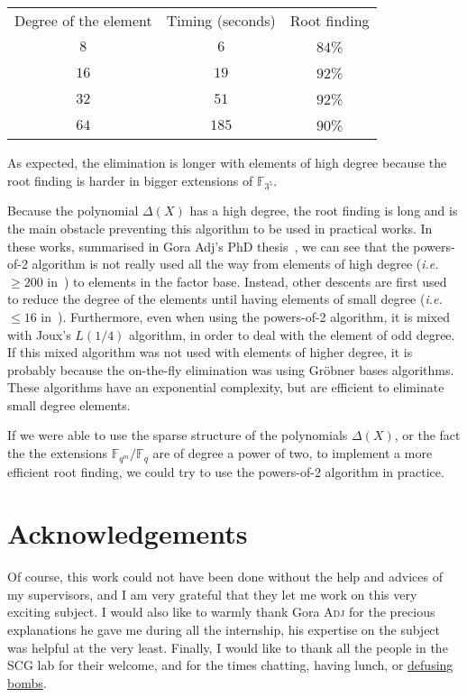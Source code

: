 \documentclass[a4paper,11pt]{article}
\theoremstyle{break}
\theoremstyle{sc}
\theoremstyle{definition}
\theoremstyle{remark}
\newcommand{\ie}{\emph{i.e.\ }}
\begin{document}
\begin{center}
\begin{tabular}[here]{ccc}
  Degree of the element & Timing (seconds) & Root finding \\
  $8$ & $6$ & $84$\% \\
  $16$ & $19$ & $92$\% \\
  $32$ & $51$ & $92$\% \\
  $64$ & $185$ & $90$\% \\
\end{tabular}
\end{center}

As expected, the elimination is longer with elements of high degree because the
root finding is harder in bigger extensions of $\mathbb{F}_{3^5}$.

Because the polynomial $\Delta(X)$ has a high degree, the root finding is long
and is the main obstacle preventing this algorithm to be used in practical
works. In these works, summarised in Gora Adj's PhD thesis~\cite{Adj16}, we
can see that the powers-of-2 algorithm is not really used all the way from elements
of high degree (\ie $\geq 200$ in~\cite{Adj16}) to elements in the factor base.
Instead, other descents  are first used to reduce the degree of the elements
until having elements of small degree (\ie $\leq 16$ in~\cite{Adj16}).
Furthermore, even when using the powers-of-2 algorithm, it is mixed with
Joux's $L(1/4)$ algorithm, in order to deal with the element of odd
degree. If this mixed algorithm was not used with elements of higher
degree, it is probably because the on-the-fly elimination was using
Gröbner bases algorithms. These algorithms have an exponential complexity, but
are efficient to eliminate small degree elements.

If we were able to use the
sparse structure of the polynomials $\Delta(X)$, or the fact the the extensions
$\mathbb{F}_{q^m}/\mathbb{F}_q$ are of degree a power of two, to implement a more
efficient root finding, we could try to use the powers-of-2 algorithm in
practice.

\section*{Acknowledgements}

Of course, this work could not have been done without the help and advices of my
supervisors, and I am very grateful that they let me work on this very exciting
subject. I would also like to warmly thank Gora \textsc{Adj} for the
precious explanations he gave me during all the internship, his expertise on the
subject was helpful at the very least. Finally, I would like to thank all the
people in the SCG lab for their welcome, and for the times chatting, having
lunch, or \href{http://www.keeptalkinggame.com/}{defusing bombs}.



\end{document}
